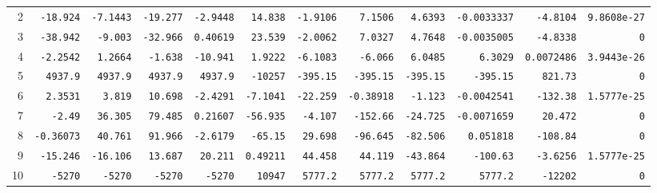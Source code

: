 \begin{landscape}
\begin{tabular}{rrrrrrrrrrrr}
2 & \texttt{-18.924} & \texttt{-7.1443} & \texttt{-19.277} & \texttt{-2.9448} & \texttt{14.838} & \texttt{-1.9106} & \texttt{7.1506} & \texttt{4.6393} & \texttt{-0.0033337} & \texttt{-4.8104} & \texttt{9.8608e-27} \\

3 & \texttt{-38.942} & \texttt{-9.003} & \texttt{-32.966} & \texttt{0.40619} & \texttt{23.539} & \texttt{-2.0062} & \texttt{7.0327} & \texttt{4.7648} & \texttt{-0.0035005} & \texttt{-4.8338} & \texttt{0} \\

4 & \texttt{-2.2542} & \texttt{1.2664} & \texttt{-1.638} & \texttt{-10.941} & \texttt{1.9222} & \texttt{-6.1083} & \texttt{-6.066} & \texttt{6.0485} & \texttt{6.3029} & \texttt{0.0072486} & \texttt{3.9443e-26} \\

5 & \texttt{4937.9} & \texttt{4937.9} & \texttt{4937.9} & \texttt{4937.9} & \texttt{-10257} & \texttt{-395.15} & \texttt{-395.15} & \texttt{-395.15} & \texttt{-395.15} & \texttt{821.73} & \texttt{0} \\

6 & \texttt{2.3531} & \texttt{3.819} & \texttt{10.698} & \texttt{-2.4291} & \texttt{-7.1041} & \texttt{-22.259} & \texttt{-0.38918} & \texttt{-1.123} & \texttt{-0.0042541} & \texttt{-132.38} & \texttt{1.5777e-25} \\

7 & \texttt{-2.49} & \texttt{36.305} & \texttt{79.485} & \texttt{0.21607} & \texttt{-56.935} & \texttt{-4.107} & \texttt{-152.66} & \texttt{-24.725} & \texttt{-0.0071659} & \texttt{20.472} & \texttt{0} \\

8 & \texttt{-0.36073} & \texttt{40.761} & \texttt{91.966} & \texttt{-2.6179} & \texttt{-65.15} & \texttt{29.698} & \texttt{-96.645} & \texttt{-82.506} & \texttt{0.051818} & \texttt{-108.84} & \texttt{0} \\

9 & \texttt{-15.246} & \texttt{-16.106} & \texttt{13.687} & \texttt{20.211} & \texttt{0.49211} & \texttt{44.458} & \texttt{44.119} & \texttt{-43.864} & \texttt{-100.63} & \texttt{-3.6256} & \texttt{1.5777e-25} \\

10 & \texttt{-5270} & \texttt{-5270} & \texttt{-5270} & \texttt{-5270} & \texttt{10947} & \texttt{5777.2} & \texttt{5777.2} & \texttt{5777.2} & \texttt{5777.2} & \texttt{-12202} & \texttt{0} \\


\end{tabular}
\end{landscape}

